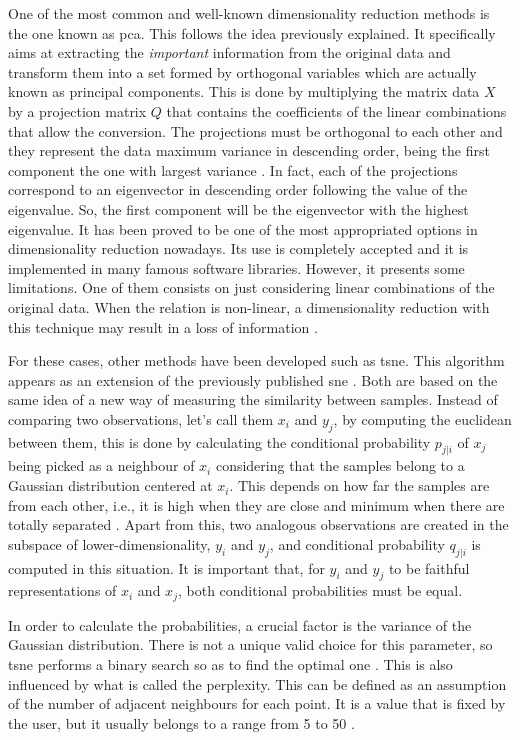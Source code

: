 	One of the most common and well-known dimensionality reduction methods is the one known as \acrfull{pca}. This follows the idea previously explained. It specifically aims at extracting the \textit{important} information from the original data and transform them into a set formed by orthogonal variables which are actually known as principal components. This is done by multiplying the matrix data $X$ by a projection matrix $Q$ that contains the coefficients of the linear combinations that allow the conversion. The projections must be orthogonal to each other and they represent the data maximum variance in descending order, being the first component the one with largest variance \cite{Abdi2010}. In fact, each of the projections correspond to an eigenvector in descending order following the value of the eigenvalue. So, the first component will be the eigenvector with the highest eigenvalue. It has been proved to be one of the most appropriated options in dimensionality reduction nowadays. Its use is completely accepted and it is implemented in many famous software libraries. However, it presents some limitations. One of them consists on just considering linear combinations of the original data. When the relation is non-linear, a dimensionality reduction with this technique may result in a loss of information \cite{AmatRodrigo2017}. 
	
	For these cases, other methods have been developed such as \acrfull{tsne}. This algorithm appears as an extension of the previously published \acrfull{sne} \cite{Hinton2003}. Both are based on the same idea of a new way of measuring the similarity between samples. Instead of comparing two observations, let's call them $x_i$ and $y_j$, by computing the euclidean between them, this is done by calculating the conditional probability $p_{j|i}$ of $x_j$ being picked as a neighbour of $x_i$ considering that the samples belong to a Gaussian distribution centered at $x_i$. This depends on how far the samples are from each other, i.e., it is high when they are close and minimum when there are totally separated \cite{VanDerMaaten2008}. Apart from this, two analogous observations are created in the subspace of lower-dimensionality, $y_i$ and $y_j$, and conditional probability $q_{j|i}$ is computed in this situation. It is important that, for $y_i$ and $y_j$ to be faithful representations of $x_i$ and $x_j$, both conditional probabilities must be equal.
	
	In order to calculate the probabilities, a crucial factor is the variance of the Gaussian distribution. There is not a unique valid choice for this parameter, so \acrshort{tsne} performs a binary search so as to find the optimal one \cite{AmatRodrigo2017}. This is also influenced by what is called the perplexity. This can be defined as an assumption of the number of adjacent neighbours for each point. It is a value that is fixed by the user, but it usually belongs to a range from 5 to 50 \cite{VanDerMaaten2008}. 
	
